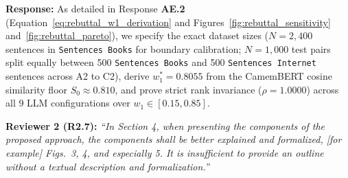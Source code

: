\documentclass[11pt,a4paper]{article}
\begin{document}
\noindent\textbf{Response:}
As detailed in Response \textbf{AE.2} (Equation~\ref{eq:rebuttal_w1_derivation} and Figures~\ref{fig:rebuttal_sensitivity} and~\ref{fig:rebuttal_pareto}), we specify the exact dataset sizes ($N = 2{,}400$ sentences in \texttt{Sentences Books} for boundary calibration; $N = 1{,}000$ test pairs split equally between 500 \texttt{Sentences Books} and 500 \texttt{Sentences Internet} sentences across A2 to C2), derive $w_1^* = 0.8055$ from the CamemBERT cosine similarity floor $S_0 \approx 0.810$, and prove strict rank invariance ($\rho = 1.0000$) across all 9 LLM configurations over $w_1 \in [0.15, 0.85]$.

\begin{reviewbox}
\textbf{Reviewer 2 (R2.7):} \textit{``In Section 4, when presenting the components of the proposed approach, the components shall be better explained and formalized, [for example] Figs.\ 3, 4, and especially 5. It is insufficient to provide an outline without a textual description and formalization.''}
\end{reviewbox}
\end{document}
